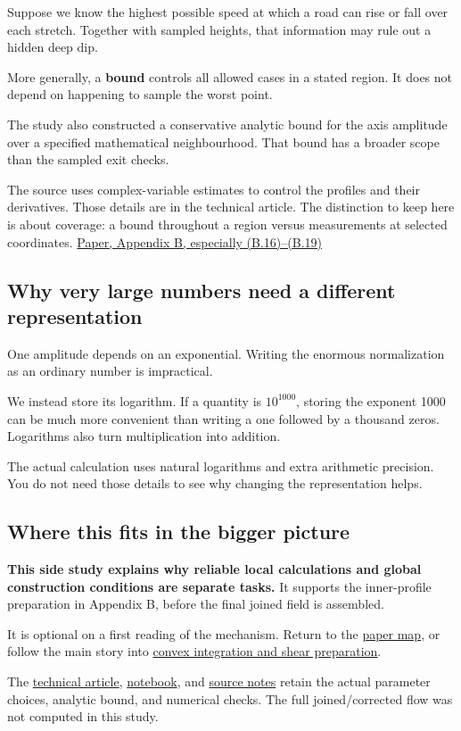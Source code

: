 \documentclass[
  english,
  11pt,
]{article}
\begin{document}
Suppose we know the highest possible speed at which a road can rise or
fall over each stretch. Together with sampled heights, that information
may rule out a hidden deep dip.

More generally, a \textbf{bound} controls all allowed cases in a stated
region. It does not depend on happening to sample the worst point.

The study also constructed a conservative analytic bound for the axis
amplitude over a specified mathematical neighbourhood. That bound has a
broader scope than the sampled exit checks.

The source uses complex-variable estimates to control the profiles and
their derivatives. Those details are in the technical article. The
distinction to keep here is about coverage: a bound throughout a region
versus measurements at selected coordinates.
\href{https://cdn.openai.com/pdf/32d9f210-8b73-45e0-91bc-82a30aef8a9a/navier-stokes.pdf}{Paper,
Appendix B, especially (B.16)--(B.19)}

\subsection{Why very large numbers need a different
representation}\label{why-very-large-numbers-need-a-different-representation}

One amplitude depends on an exponential. Writing the enormous
normalization as an ordinary number is impractical.

We instead store its logarithm. If a quantity is \(10^{1000}\), storing
the exponent 1000 can be much more convenient than writing a one
followed by a thousand zeros. Logarithms also turn multiplication into
addition.

The actual calculation uses natural logarithms and extra arithmetic
precision. You do not need those details to see why changing the
representation helps.

\subsection{Where this fits in the bigger
picture}\label{where-this-fits-in-the-bigger-picture}

\textbf{This side study explains why reliable local calculations and
global construction conditions are separate tasks.} It supports the
inner-profile preparation in Appendix B, before the final joined field
is assembled.

It is optional on a first reading of the mechanism. Return to the
\href{../paper-map/article.html}{paper map}, or follow the main story
into \href{../convex-integration/article.html}{convex integration and
shear preparation}.

The \href{technical-article.html}{technical article},
\href{../../code/d6_global_axis/study.ipynb}{notebook}, and
\href{source-notes.md}{source notes} retain the actual parameter
choices, analytic bound, and numerical checks. The full joined/corrected
flow was not computed in this study.
\end{document}
